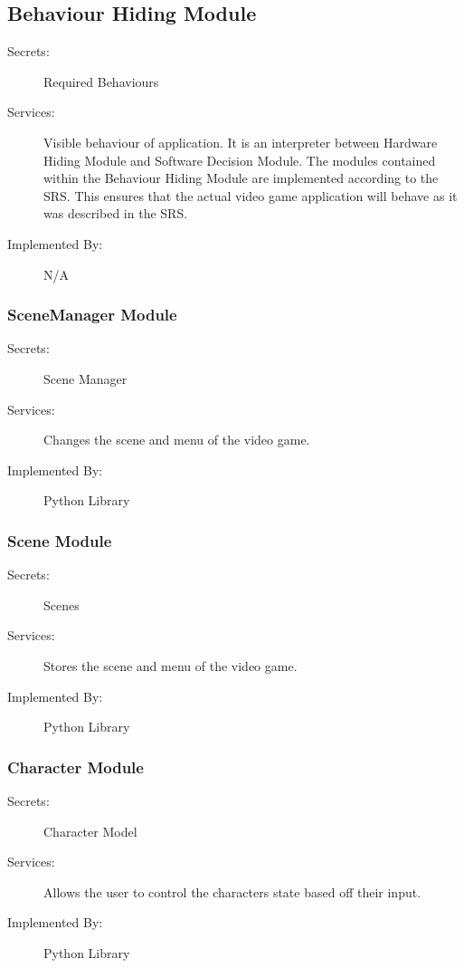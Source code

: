\documentclass[12pt, titlepage]{article}
\begin{document}
\subsection{Behaviour Hiding Module}

\begin{description}
\item[Secrets:] Required Behaviours
\item[Services:] Visible behaviour of application. It is an interpreter between Hardware Hiding Module and Software Decision Module. The modules contained within the Behaviour Hiding Module are implemented according to the SRS. This ensures that the actual video game application will behave as it was described in the SRS.
\item[Implemented By:] N/A
\end{description}

\subsubsection{SceneManager Module}

\begin{description}
\item[Secrets:] Scene Manager
\item[Services:] Changes the scene and menu of the video game.
\item[Implemented By:] Python Library
\end{description}

\subsubsection{Scene Module}

\begin{description}
\item[Secrets:] Scenes
\item[Services:] Stores the scene and menu of the video game.
\item[Implemented By:] Python Library
\end{description}

\subsubsection{Character Module}
\begin{description}
\item[Secrets:] Character Model
\item[Services:] Allows the user to control the characters state based off their input.
\item[Implemented By:] Python Library
\end{description}
\end{document}
